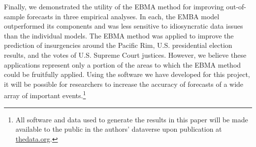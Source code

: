 \documentclass[12pt,fullpage]{article}
\newcommand{\note}[1]{\footnote{\doublespacing#1 \vspace{4 mm}}}
\begin{document}
Finally, we demonstrated the utility of the EBMA method for improving
out-of-sample forecasts in three empirical analyses.  In each, the
EMBA model outperformed its components and was less sensitive to
idiosyncratic data issues than the individual models.  The EBMA method
was applied to improve the prediction of insurgencies around the
Pacific Rim, U.S. presidential election results, and the votes of
U.S. Supreme Court justices. However, we believe these applications
represent only a portion of the areas to which the EBMA method could
be fruitfully applied.  Using the software we have developed for this
project, it will be possible for researchers to increase the accuracy
of forecasts of a wide array of important events.\note{All software
  and data used to generate the results in this paper will be made
  available to the public in the authors' dataverse upon publication
  at \url{thedata.org}.}

\newpage
\singlespacing

 
%





\end{document}
